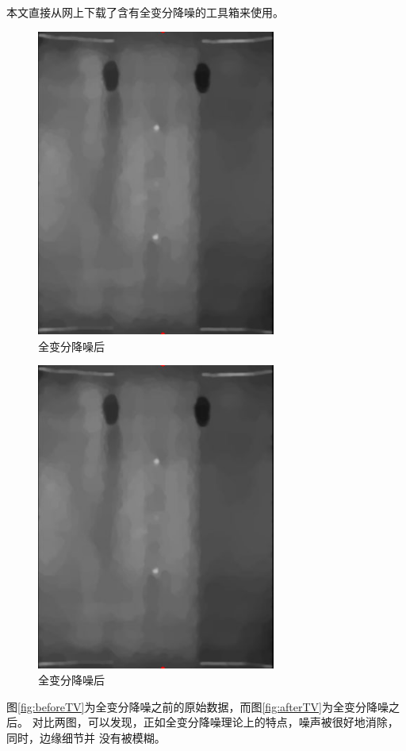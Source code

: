 本文直接从网上下载了含有全变分降噪的工具箱来使用。
\begin{figure}[!h]
\center
\includegraphics[width=0.7\textwidth]{figure/patternp/afterTV.jpg}
\caption{全变分降噪后}
\end{figure}
\begin{figure}[!h]
\center
\includegraphics[width=0.7\textwidth]{figure/patternp/afterTV.jpg}
\caption{全变分降噪后}
\end{figure}
图\ref{fig:beforeTV}为全变分降噪之前的原始数据，而图\ref{fig:afterTV}为全变分降噪之后。
对比两图，可以发现，正如全变分降噪理论上的特点，噪声被很好地消除，同时，边缘细节并
没有被模糊。



